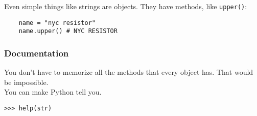 \documentclass{beamer}
\begin{document}
\begin{frame}[fragile]
  Even simple things like strings are objects. They have methods, like \lstinline{upper()}:
  \begin{lstlisting}
    name = "nyc resistor"
    name.upper() # NYC RESISTOR
  \end{lstlisting}
\end{frame}

\begin{frame}[fragile]
  \frametitle{Documentation}
  You don't have to memorize all the methods that every object has. That would be impossible.\\
  You can make Python tell you.
  \begin{lstlisting}
>>> help(str)    
  \end{lstlisting}

\end{frame}
\end{document}
